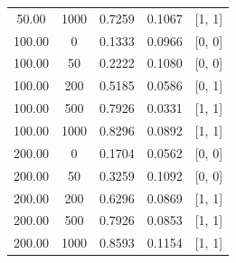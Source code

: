 \documentclass{article}
\begin{document}
\begin{table}[h]
\begin{tabular}{ccccc}
50.00 & 1000 & 0.7259 & 0.1067 & [1, 1] \\
100.00 & 0 & 0.1333 & 0.0966 & [0, 0] \\
100.00 & 50 & 0.2222 & 0.1080 & [0, 0] \\
100.00 & 200 & 0.5185 & 0.0586 & [0, 1] \\
100.00 & 500 & 0.7926 & 0.0331 & [1, 1] \\
100.00 & 1000 & 0.8296 & 0.0892 & [1, 1] \\
200.00 & 0 & 0.1704 & 0.0562 & [0, 0] \\
200.00 & 50 & 0.3259 & 0.1092 & [0, 0] \\
200.00 & 200 & 0.6296 & 0.0869 & [1, 1] \\
200.00 & 500 & 0.7926 & 0.0853 & [1, 1] \\
200.00 & 1000 & 0.8593 & 0.1154 & [1, 1] \\
\hline
\end{tabular}
\end{table}
\end{document}
